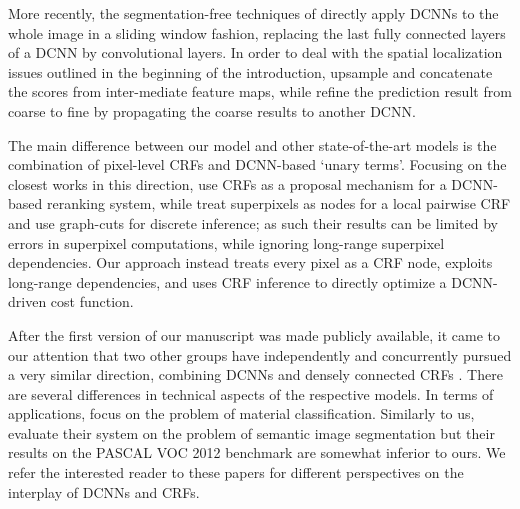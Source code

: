 
More recently, the segmentation-free techniques of \citep{long2014fully, eigen2014predicting} directly apply DCNNs to the whole image in a sliding window fashion, replacing the last fully connected layers of a DCNN  by convolutional layers. In order to deal with the spatial localization issues outlined in the beginning of the introduction, \citet{long2014fully} upsample and concatenate the scores from inter-mediate feature maps, while \citet{eigen2014predicting} refine the prediction result from coarse to fine by propagating the coarse results to another DCNN. 


The main difference between our model and other state-of-the-art models is the combination of pixel-level CRFs and DCNN-based `unary terms'. Focusing on the closest works in this direction, \citet{cogswell2014combining} use CRFs as a proposal mechanism for a DCNN-based reranking system, while \citet{farabet2013learning} treat superpixels as  nodes for a local pairwise CRF and use graph-cuts for discrete inference; as such their results can be limited by errors in superpixel computations, while ignoring  long-range superpixel dependencies. Our approach instead treats every pixel as a CRF node, exploits long-range dependencies, and uses  CRF inference to directly optimize a DCNN-driven cost function.

After the first version of our manuscript was made publicly available,
it came to our attention that two other groups have independently
and concurrently pursued a very similar direction, combining DCNNs and
densely connected CRFs \citep{bell2014material,
  zheng2015crfrnn}. There are several differences in technical aspects
of the respective models. In terms of applications,
\citet{bell2014material} focus on the problem of material
classification. Similarly to us, \citet{zheng2015crfrnn} evaluate
their system on the problem of semantic image segmentation but their
results on the PASCAL VOC 2012 benchmark are somewhat inferior to
ours. We refer the interested reader to these papers for different
perspectives on the interplay of DCNNs and CRFs.

